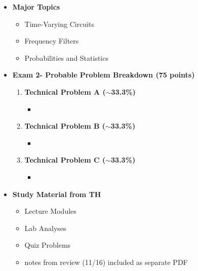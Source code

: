 \documentclass[11pt]{article}
\newcommand{\EXAMNUM}{2\hspace{0mm}}
\begin{document}
\begin{itemize}
\item\textbf{\Large Major Topics}\\
	\begin{itemize}

	\item {\large Time-Varying Circuits}
	
	\item {\large Frequency Filters}
	
	\item {\large Probabilities and Statistics}

	\end{itemize}


%
\item  \textbf{\Large Exam \EXAMNUM  - Probable Problem Breakdown (75 points) }\\
\Large
	\begin{enumerate}


		\item  \textbf{\Large Technical Problem A ($\sim$33.3\%)}\\
		\begin{itemize}
			\item 
		\end{itemize}
		\item  \textbf{\Large Technical Problem B ($\sim$33.3\%)}\\
		\begin{itemize}
			\item 
		\end{itemize}
		\item  \textbf{\Large Technical Problem C ($\sim$33.3\%)}\\
		\begin{itemize}
			\item 

		\end{itemize}

	\end{enumerate}

\item  \textbf{\Large Study Material from TH}\\
\begin{itemize}

\item Lecture Modules

\item Lab Analyses 

\item Quiz Problems

\item notes from review (11/16) included as separate PDF

\end{itemize}




\end{itemize}


	
\end{document}
